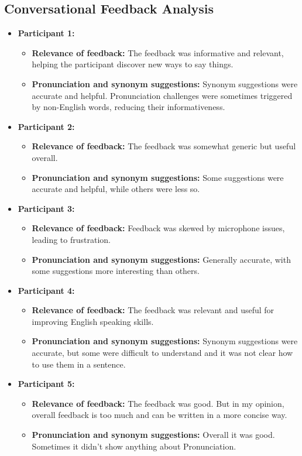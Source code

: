 \documentclass{article}
\begin{document}
\subsection{Conversational Feedback Analysis}
\begin{itemize}
    \item \textbf{Participant 1:}
    \begin{itemize}
        \item \textbf{Relevance of feedback:} The feedback was informative and relevant, helping the participant discover new ways to say things.
        \item \textbf{Pronunciation and synonym suggestions:} Synonym suggestions were accurate and helpful. Pronunciation challenges were sometimes triggered by non-English words, reducing their informativeness.
    \end{itemize}
    \item \textbf{Participant 2:}
    \begin{itemize}
        \item \textbf{Relevance of feedback:} The feedback was somewhat generic but useful overall.
        \item \textbf{Pronunciation and synonym suggestions:} Some suggestions were accurate and helpful, while others were less so.
    \end{itemize}
    \item \textbf{Participant 3:}
    \begin{itemize}
        \item \textbf{Relevance of feedback:} Feedback was skewed by microphone issues, leading to frustration.
        \item \textbf{Pronunciation and synonym suggestions:} Generally accurate, with some suggestions more interesting than others.
    \end{itemize}
    \item \textbf{Participant 4:}
    \begin{itemize}
        \item \textbf{Relevance of feedback:} The feedback was relevant and useful for improving English speaking skills.
        \item \textbf{Pronunciation and synonym suggestions:} Synonym suggestions were accurate, but some were difficult to understand and it was not clear how to use them in a sentence.
    \end{itemize}
        \item \textbf{Participant 5:}
    \begin{itemize}
        \item \textbf{Relevance of feedback:} The feedback was good. But in my opinion, overall feedback is too much and can be written in a more concise way.
        \item \textbf{Pronunciation and synonym suggestions:} Overall it was good. Sometimes it didn't show anything about Pronunciation.
    \end{itemize}
\end{itemize}
\end{document}
